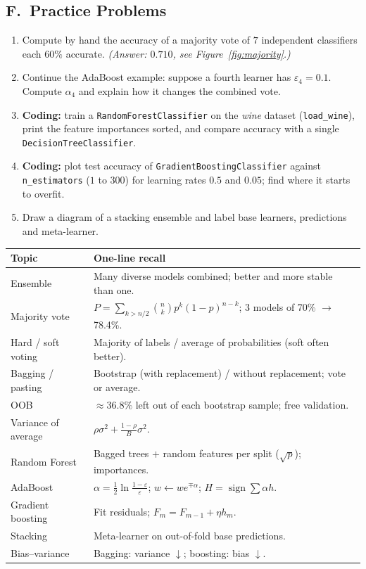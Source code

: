 \subsection*{F.\ Practice Problems}
\begin{enumerate}
  \item Compute by hand the accuracy of a majority vote of $7$ independent classifiers each $60\%$ accurate. \textit{(Answer: $0.710$, see Figure~\ref{fig:majority}.)}
  \item Continue the AdaBoost example: suppose a fourth learner has $\varepsilon_4=0.1$. Compute $\alpha_4$ and explain how it changes the combined vote.
  \item \textbf{Coding:} train a \texttt{RandomForestClassifier} on the \emph{wine} dataset (\texttt{load\_wine}), print the feature importances sorted, and compare accuracy with a single \texttt{DecisionTreeClassifier}.
  \item \textbf{Coding:} plot test accuracy of \texttt{GradientBoostingClassifier} against \texttt{n\_estimators} ($1$ to $300$) for learning rates $0.5$ and $0.05$; find where it starts to overfit.
  \item Draw a diagram of a stacking ensemble and label base learners, predictions and meta-learner.
\end{enumerate}

\begin{revision}
\begin{center}\small
\begin{tabular}{@{}p{3.6cm}p{9.6cm}@{}}
\toprule
\textbf{Topic} & \textbf{One-line recall}\\
\midrule
Ensemble & Many diverse models combined; better and more stable than one.\\
Majority vote & $P=\sum_{k>n/2}\binom nk p^k(1-p)^{n-k}$; 3 models of 70\% $\to$ 78.4\%.\\
Hard / soft voting & Majority of labels / average of probabilities (soft often better).\\
Bagging / pasting & Bootstrap (with replacement) / without replacement; vote or average.\\
OOB & $\approx36.8\%$ left out of each bootstrap sample; free validation.\\
Variance of average & $\rho\sigma^2+\frac{1-\rho}{B}\sigma^2$.\\
Random Forest & Bagged trees $+$ random features per split ($\sqrt p$); importances.\\
AdaBoost & $\alpha=\frac12\ln\frac{1-\varepsilon}{\varepsilon}$; $w\leftarrow w e^{\mp\alpha}$; $H=\operatorname{sign}\sum\alpha h$.\\
Gradient boosting & Fit residuals; $F_m=F_{m-1}+\eta h_m$.\\
Stacking & Meta-learner on out-of-fold base predictions.\\
Bias--variance & Bagging: variance $\downarrow$; boosting: bias $\downarrow$.\\
\bottomrule
\end{tabular}
\end{center}
\end{revision}
